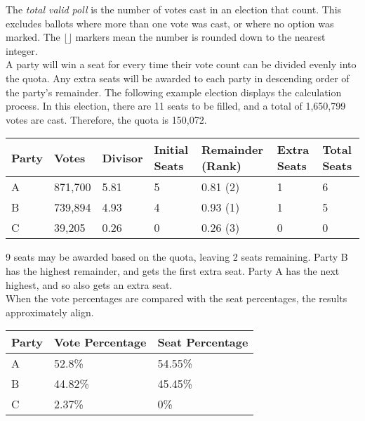 \documentclass{article}
\begin{document}
    The \textit{total valid poll} is the number of votes cast in an election that count. This excludes ballots where more than one vote was cast, or where no option was marked. The $\lfloor \rfloor$ markers mean the number is rounded down to the nearest integer.\\

    A party will win a seat for every time their vote count can be divided evenly into the quota. Any extra seats will be awarded to each party in descending order of the party's remainder. The following example election displays the calculation process. In this election, there are 11 seats to be filled, and a total of 1,650,799 votes are cast. Therefore, the quota is 150,072.\\

    \begin{adjustbox}{center}
    \begin{tabular}{ |l|l|l|l|l|l|l| }
        \hline
        Party & Votes & Divisor & Initial Seats & Remainder (Rank) & Extra Seats & Total Seats \\
        \hline
        A & 871,700 & 5.81 & 5 & 0.81 (2) & 1 & 6 \\
        \hline
        B & 739,894 & 4.93 & 4 & 0.93 (1) & 1 & 5 \\
        \hline
        C & 39,205 & 0.26 & 0 & 0.26 (3) & 0 & 0 \\
        \hline
    \end{tabular}
    \end{adjustbox}
    
    9 seats may be awarded based on the quota, leaving 2 seats remaining. Party B has the highest remainder, and gets the first extra seat. Party A has the next highest, and so also gets an extra seat. \\

    When the vote percentages are compared with the seat percentages, the results approximately align.\\
    
    \begin{adjustbox}{center}
    \begin{tabular}{ |l|l|l| }
        \hline
        Party & Vote Percentage & Seat Percentage \\
        \hline
        A & 52.8\% & 54.55\% \\
        \hline
        B & 44.82\% & 45.45\% \\
        \hline
        C & 2.37\% & 0\% \\
        \hline
    \end{tabular}
    \end{adjustbox}
\end{document}
